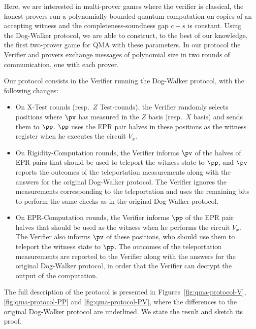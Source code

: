  Here, we are interested in multi-prover games where the verifier is classical,
 the honest provers run a polynomially bounded quantum computation on copies
 of an accepting witness and the completeness-soundness gap $c-s$ is constant.
Using the Dog-Walker protocol, we are able to construct, to the best of our knowledge, the first two-prover
game for QMA with these parameters. In our protocol the Verifier and provers exchange messages of polynomial size 
in two rounds of communication, one with each
prover.

Our protocol consists in the Verifier running the Dog-Walker protocol,
  with the following changes:
  \begin{itemize}
    \item On X-Test rounds (resp.\ $Z$ Test-rounds), the Verifier randomly selects  positions where
      $\pv$ has measured in the $Z$ basis (resp.\ $X$ basis) and sends them to $\pp$. $\pp$ uses the EPR pair halves in these positions as the witness register when he executes the circuit $V_x$.
    \item On Rigidity-Computation rounds, the Verifier
      informs $\pv$ of the halves of EPR pairs that should be used to teleport the witness
      state to $\pp$, and $\pv$ reports the outcomes of the teleportation
      measurements along with the answers for the original Dog-Walker protocol. The Verifier ignores the measurements corresponding to the teleportation and uses the remaining bits to perform the same checks as in the original Dog-Walker protocol.
      \item On EPR-Computation rounds, the Verifier informs $\pp$ of the
      EPR pair halves that should be used as the witness when he performs the circuit $V_x$.  
      The Verifier
      also informs $\pv$ of these positions, who should use them to teleport the witness
      state to $\pp$.  The outcomes of the teleportation      measurements are reported to the Verifier along with the answers for the original Dog-Walker protocol, in order that the Verifier can decrypt the output of the computation.
  \end{itemize}

The full description of the protocol is presented in Figures~\ref{fig:qma-protocol-V}, \ref{fig:qma-protocol-PP} and \ref{fig:qma-protocol-PV}, where the differences to the original Dog-Walker protocol are underlined. We state the result and sketch its proof. 


